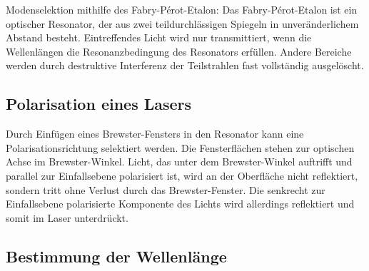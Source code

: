 

Modenselektion mithilfe des Fabry-Pérot-Etalon:
Das Fabry-Pérot-Etalon ist ein optischer Resonator, der aus zwei teildurchlässigen Spiegeln in unveränderlichem Abstand besteht. Eintreffendes Licht wird nur transmittiert, wenn die Wellenlängen die Resonanzbedingung des Resonators erfüllen.
Andere Bereiche werden durch destruktive Interferenz der Teilstrahlen fast vollständig ausgelöscht. 


\subsection{Polarisation eines Lasers}
Durch Einfügen eines Brewster-Fensters in den Resonator kann eine Polarisationsrichtung selektiert werden.
Die Fensterflächen stehen  zur optischen Achse im Brewster-Winkel. Licht, das unter dem Brewster-Winkel auftrifft und parallel zur Einfallsebene polarisiert ist, wird an der Oberfläche nicht reflektiert, sondern tritt ohne Verlust durch das Brewster-Fenster. Die senkrecht zur Einfallsebene polarisierte Komponente des Lichts wird allerdings reflektiert und somit im Laser unterdrückt.


\subsection{Bestimmung der Wellenlänge}

